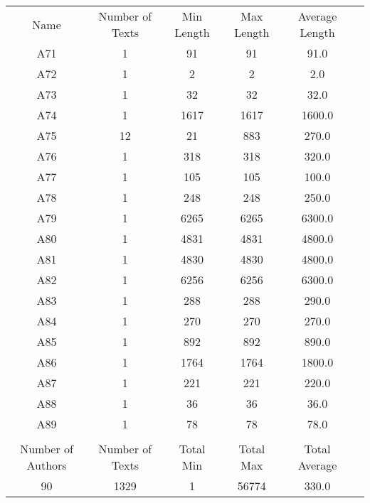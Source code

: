 \newpage
\begin{tabular}{cccccc}
 Name & Number of Texts & Min Length& Max Length & Average Length\\
A71 & 1 & 91 & 91 & 91.0\\
A72 & 1 & 2 & 2 & 2.0\\
A73 & 1 & 32 & 32 & 32.0\\
A74 & 1 & 1617 & 1617 & 1600.0\\
A75 & 12 & 21 & 883 & 270.0\\
A76 & 1 & 318 & 318 & 320.0\\
A77 & 1 & 105 & 105 & 100.0\\
A78 & 1 & 248 & 248 & 250.0\\
A79 & 1 & 6265 & 6265 & 6300.0\\
A80 & 1 & 4831 & 4831 & 4800.0\\
A81 & 1 & 4830 & 4830 & 4800.0\\
A82 & 1 & 6256 & 6256 & 6300.0\\
A83 & 1 & 288 & 288 & 290.0\\
A84 & 1 & 270 & 270 & 270.0\\
A85 & 1 & 892 & 892 & 890.0\\
A86 & 1 & 1764 & 1764 & 1800.0\\
A87 & 1 & 221 & 221 & 220.0\\
A88 & 1 & 36 & 36 & 36.0\\
A89 & 1 & 78 & 78 & 78.0\\
& & & & & \\ 
Number of Authors & Number of Texts & Total Min & Total Max & Total Average \\ 
90 & 1329 & 1 & 56774 & 330.0\\ 
\end{tabular}
